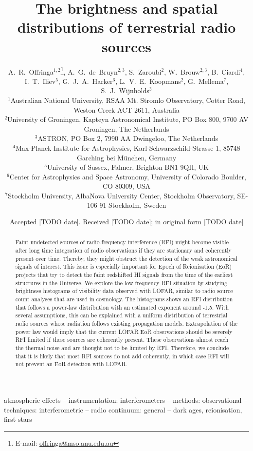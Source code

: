 \documentclass[useAMS,usenatbib]{mn2e}
\title[Brightness and spatial distributions of terrestrial radio sources]{The brightness and spatial distributions of terrestrial radio sources}
\author[A.~R.~Offringa et al.]{
  A.~R.~Offringa$^{1,2}$\thanks{E-mail:
\url{offringa@mso.anu.edu.au}},
A.~G.~de~Bruyn$^{2,3}$,
S.~Zaroubi$^2$,
W.~Brouw$^{2,3}$,
B.~Ciardi$^4$,
I.~T.~Iliev$^5$,
\newauthor
G.~J.~A.~Harker$^6$,
L.~V.~E.~Koopmans$^2$,
G.~Mellema$^7$,
S.~J.~Wijnholds$^3$
\\
$^{1}$Australian National University, RSAA Mt. Stromlo Observatory, Cotter Road, Weston Creek ACT 2611, Australia\\
$^{2}$University of Groningen, Kapteyn Astronomical Institute, PO Box 800, 9700 AV Groningen, The Netherlands\\
$^{3}$ASTRON, PO Box 2, 7990 AA Dwingeloo, The Netherlands\\
$^{4}$Max-Planck Institute for Astrophysics, Karl-Schwarzschild-Strasse 1, 85748 Garching bei M\"unchen, Germany\\
$^{5}$University of Sussex, Falmer, Brighton BN1 9QH, UK\\
$^{6}$Center for Astrophysics and Space Astronomy, University of Colorado Boulder, CO 80309, USA\\
$^7$Stockholm University, AlbaNova University Center, Stockholm Observatory, SE-106 91 Stockholm, Sweden 
}
\begin{document}
\date{Accepted [TODO date]. Received [TODO date]; in original form [TODO date]}
\pagerange{\pageref{firstpage}--\pageref{lastpage}}

\maketitle
\label{firstpage}

\begin{abstract}
Faint undetected sources of radio-frequency interference (RFI) might become visible after long time integration of radio observations if they are stationary and coherently present over time. Thereby, they might obstruct the detection of the weak astronomical signals of interest. This issue is especially important for Epoch of Reionisation (EoR) projects that try to detect the faint redshifted HI signals from the time of the earliest structures in the Universe. We explore the low-frequency RFI situation by studying brightness histograms of visibility data observed with LOFAR, similar to radio source count analyses that are used in cosmology. The histograms shows an RFI distribution that follows a power-law distribution with an estimated exponent around -1.5. With several assumptions, this can be explained with a uniform distribution of terrestrial radio sources whose radiation follows existing propagation models. Extrapolation of the power law would imply that the current LOFAR EoR observations should be severely RFI limited if these sources are coherently present. These observations almost reach the thermal noise and are thought not to be limited by RFI. Therefore, we conclude that it is likely that most RFI sources do not add coherently, in which case RFI will not prevent an EoR detection with LOFAR.
\end{abstract}

\begin{keywords}
atmospheric effects -- instrumentation: interferometers -- methods: observational -- techniques: interferometric -- radio continuum: general -- dark ages, reionisation, first stars
\end{keywords}
\end{document}
